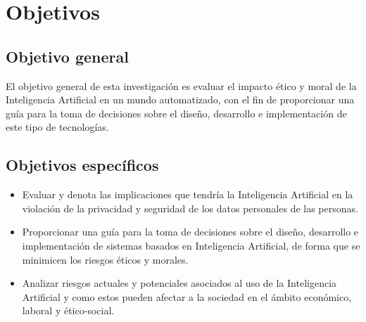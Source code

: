 \renewcommand{\cftsecfont}{\bfseries}



\renewcommand{\cftsubsubsecfont}{\itshape}


\usepackage[spanish]{babel}


\renewcommand\cftchapdotsep{\cftdotsep}
\renewcommand\cftchapleader{\cftdotfill{\cftchapdotsep}}

  \thispagestyle{empty}
  
  \portada %

  \newpage
  
  \tableofcontents

  \newpage


  \section{Objetivos}
  

  \subsection{Objetivo general}
  El objetivo general de esta investigación es evaluar el impacto ético y moral de la Inteligencia
  Artificial en un mundo automatizado, con el fin de proporcionar una guía para la toma de
  decisiones sobre el diseño, desarrollo e implementación de este tipo de tecnologías.

  \subsection{Objetivos específicos}
  \begin{itemize}
    \item Evaluar y denota las implicaciones que tendría la Inteligencia Artificial en la violación
    de la privacidad y seguridad de los datos personales de las personas.
    \item Proporcionar una guía para la toma de decisiones sobre el diseño, desarrollo e
    implementación de sistemas basados en Inteligencia Artificial, de forma que se minimicen los
    riesgos éticos y morales.
    \item Analizar riesgos actuales y potenciales asociados al uso de la Inteligencia Artificial y
    como estos pueden afectar a la sociedad en el ámbito económico, laboral y ético-social.
  \end{itemize}

